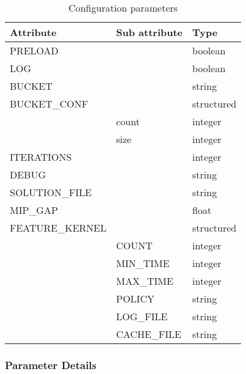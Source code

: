         \begin{table}[h]
            \centering
            \caption{Configuration parameters}
            \begin{tabular}{ | l | l | l | }
                \hline
                Attribute & Sub attribute & Type \\
                \hline
                \hline
                PRELOAD& & boolean\\ 
                \hline
                 LOG& & boolean\\ 
                \hline
                 BUCKET& & string\\ 
                \hline
                BUCKET\_CONF & & structured\\ 
                \hline
                & count & integer\\ 
                \hline
                & size & integer\\ 
                \hline
                 ITERATIONS& & integer\\ 
                \hline
                 DEBUG& & string\\ 
                \hline
                 SOLUTION\_FILE& & string\\ 
                \hline
                 MIP\_GAP& & float\\ 
                \hline
                FEATURE\_KERNEL & & structured\\ 
                \hline
                & COUNT & integer\\ 
                \hline
                & MIN\_TIME & integer\\ 
                \hline
                & MAX\_TIME & integer\\ 
                \hline
                & POLICY & string\\ 
                \hline
                & LOG\_FILE & string\\ 
                \hline
                & CACHE\_FILE & string\\ 
                \hline        
            \end{tabular}
            \label{tab:params}
        \end{table}
    
        \subsubsection{Parameter Details}
    
